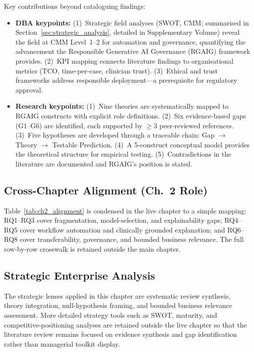 Key contributions beyond cataloguing findings:

\begin{itemize}
    \item \textbf{DBA keypoints:} (1)~Strategic field analyses (SWOT, CMM; summarised in Section~\ref{sec:strategic_analysis}, detailed in Supplementary Volume) reveal the field at CMM Level~1--2 for automation and governance, quantifying the advancement the Responsible Generative AI Governance (RGAIG) framework provides. (2)~KPI mapping connects literature findings to organisational metrics (TCO, time-per-case, clinician trust). (3)~Ethical and trust frameworks address responsible deployment---a prerequisite for regulatory approval.
    \item \textbf{Research keypoints:} (1)~Nine theories are systematically mapped to RGAIG constructs with explicit role definitions. (2)~Six evidence-based gaps (G1--G6) are identified, each supported by $\geq$3 peer-reviewed references. (3)~Five hypotheses are developed through a traceable chain: Gap $\to$ Theory $\to$ Testable Prediction. (4)~A 5-construct conceptual model provides the theoretical structure for empirical testing. (5)~Contradictions in the literature are documented and RGAIG's position is stated.
\end{itemize}

\subsection{Cross-Chapter Alignment (Ch.~2 Role)}

Table~\ref{tab:ch2_alignment} is condensed in the live chapter to a simple mapping: RQ1--RQ3 cover fragmentation, model-selection, and explainability gaps; RQ4--RQ5 cover workflow automation and clinically grounded explanation; and RQ6--RQ8 cover transferability, governance, and bounded business relevance. The full row-by-row crosswalk is retained outside the main chapter.

\subsection{Strategic Enterprise Analysis}

The strategic lenses applied in this chapter are systematic review synthesis, theory integration, null-hypothesis framing, and bounded business relevance assessment. More detailed strategy tools such as SWOT, maturity, and competitive-positioning analyses are retained outside the live chapter so that the literature review remains focused on evidence synthesis and gap identification rather than managerial toolkit display.



